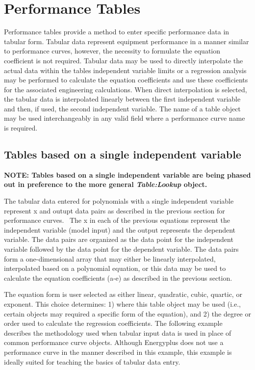 \section{Performance Tables}\label{performance-tables}

Performance tables provide a method to enter specific performance data in tabular form. Tabular data represent equipment performance in a manner similar to performance curves, however, the necessity to formulate the equation coefficient is not required. Tabular data may be used to directly interpolate the actual data within the tables independent variable limits or a regression analysis may be performed to calculate the equation coefficients and use these coefficients for the associated engineering calculations. When direct interpolation is selected, the tabular data is interpolated linearly between the first independent variable and then, if used, the second independent variable. The name of a table object may be used interchangeably in any valid field where a performance curve name is required.

\subsection{Tables based on a single independent variable}\label{tables-based-on-a-single-independent-variable}

\textbf{NOTE: Tables based on a single independent variable are being phased out in preference to the more general \emph{Table:Lookup} object.}

The tabular data entered for polynomials with a single independent variable represent x and outupt data pairs as described in the previous section for performance curves.~ The x in each of the previous equations represent the independent variable (model input) and the output represents the dependent variable. The data pairs are organized as the data point for the independent variable followed by the data point for the dependent variable. The data pairs form a one-dimensional array that may either be linearly interpolated, interpolated based on a polynomial equation, or this data may be used to calculate the equation coefficients (a-e) as described in the previous section.

The equation form is user selected as either linear, quadratic, cubic, quartic, or exponent. This choice determines: 1) where this table object may be used (i.e., certain objects may required a specific form of the equation), and 2) the degree or order used to calculate the regression coefficients. The following example describes the methodology used when tabular input data is used in place of common performance curve objects. Although Energyplus does not use a performance curve in the manner described in this example, this example is ideally suited for teaching the basics of tabular data entry.

